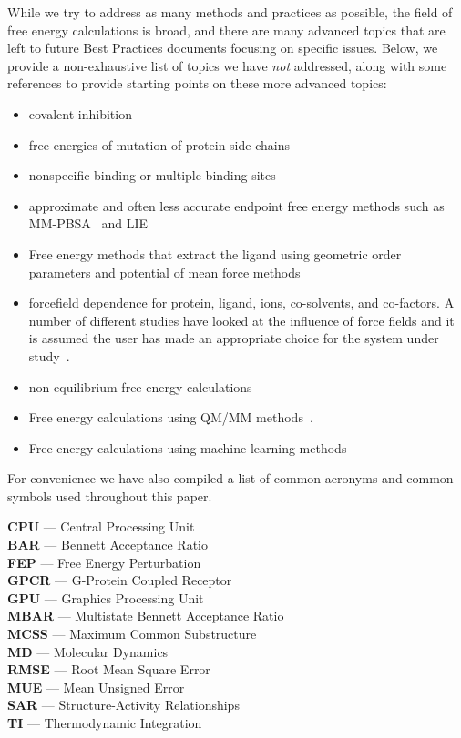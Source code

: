 \documentclass[9pt,bestpractices,pubversion]{livecoms}
\begin{document}
While we try to address as many methods and practices as possible, the field of free energy calculations is broad, and there are many advanced topics that are left to future Best Practices documents focusing on specific issues. 
Below, we provide a non-exhaustive list of topics we have \emph{not} addressed, along with some references to provide starting points on these more advanced topics:
\begin{itemize}
\item covalent inhibition~\cite{lameira2019predicting}
\item free energies of mutation of protein side chains~\cite{gapsys2016accurate,aldeghi2018accurate}
\item nonspecific binding or multiple binding sites~\cite{gill2018binding}
\item approximate and often less accurate endpoint free energy methods such as MM-PBSA~\cite{genheden2015mm} and LIE~\cite{gutierrez-de-teran2012linear}
\item Free energy methods that extract the ligand using geometric order parameters and potential of mean force methods~\cite{heinzelmann2017attachpullrelease}
\item forcefield dependence for protein, ligand, ions, co-solvents, and co-factors. A number of different studies have looked at the influence of force fields and it is assumed the user has made an appropriate choice for the system under study~\cite{loeffler2018reproducibility, vassetti2019assessment, lopes2015current}. 
\item non-equilibrium free energy calculations~\cite{gapsys2020large}
\item Free energy calculations using QM/MM methods~\cite{beierlein2011simple,dybeck2016comparison,cave-ayland2015direct}.
\item Free energy calculations using machine learning methods~\cite{rufa2020chemical, scheen2020hybrid, cole2020machine}
\end{itemize}

For convenience we have also compiled a list of common acronyms and common symbols used throughout this paper.
\begin{tcolorbox}[title=Acronyms, colback=blue!10!white]
    {\bf CPU} --- Central Processing Unit\\
     {\bf BAR} --- Bennett Acceptance Ratio\\
     {\bf FEP} --- Free Energy Perturbation\\
     {\bf GPCR} --- G-Protein Coupled Receptor\\
     {\bf GPU} --- Graphics Processing Unit\\
     {\bf MBAR} --- Multistate Bennett Acceptance Ratio\\
     {\bf MCSS} --- Maximum Common Substructure\\
     {\bf MD} --- Molecular Dynamics\\
     {\bf RMSE} --- Root Mean Square Error\\
     {\bf MUE} --- Mean Unsigned Error\\
     {\bf SAR} --- Structure-Activity Relationships\\
     {\bf TI} --- Thermodynamic Integration
\end{tcolorbox}
\end{document}
